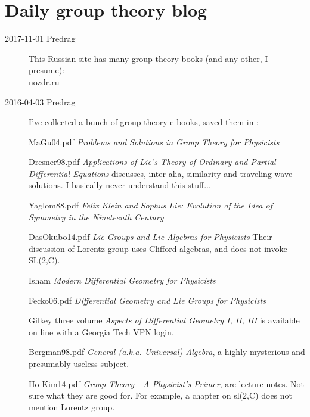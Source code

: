 

\chapter{Daily group theory blog}
\label{s-groupTheBlog}



\begin{description}

\item[2017-11-01 Predrag]
This Russian site has many group-theory books (and any other, I presume):\\
 {nozdr.ru}

\item[2016-04-03 Predrag] I've collected a bunch of group theory e-books,
saved them in :

MaGu04.pdf
{\em Problems and Solutions in Group Theory for Physicists}

Dresner98.pdf
{\em Applications of Lie's Theory of Ordinary and Partial Differential Equations}
discusses, inter alia, similarity and traveling-wave solutions.
I basically never understand this stuff...

Yaglom88.pdf {\em Felix Klein and Sophus Lie: Evolution of the
Idea of Symmetry in the Nineteenth Century}

DasOkubo14.pdf
{\em Lie Groups and Lie Algebras for Physicists}
Their discussion of Lorentz group uses
Clifford algebras, and does not invoke SL(2,C).

Isham
{\em Modern Differential Geometry for Physicists}

Fecko06.pdf
{\em Differential Geometry and Lie Groups for Physicists}

Gilkey \etal{} three volume
{\em Aspects of Differential Geometry I, II, III} is available on line
with a Georgia Tech VPN login.

Bergman98.pdf
{\em General (a.k.a. Universal) Algebra},
a highly mysterious and presumably useless subject.

{Ho-Kim14.pdf} {\em  Group Theory - A Physicist's Primer}, are lecture
notes. Not sure what they are good for. For example, a chapter on sl(2,C)
does not mention Lorentz group.


\end{description}
